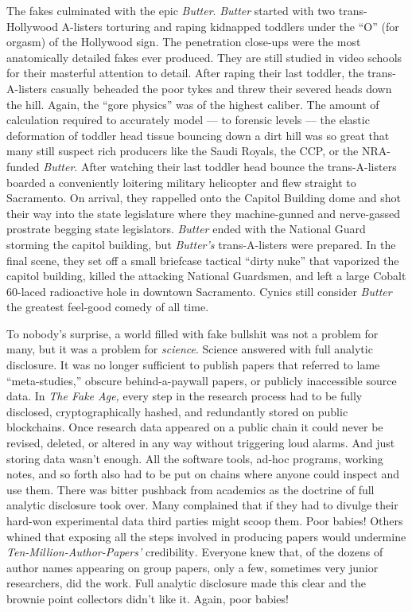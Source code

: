 The fakes culminated with the epic \emph{Butter}. \emph{Butter} started
with two trans-Hollywood A-listers torturing and raping kidnapped
toddlers under the ``O'' (for orgasm) of the Hollywood sign. The
penetration close-ups were the most anatomically detailed fakes ever
produced. They are still studied in video schools for their masterful
attention to detail. After raping their last toddler, the
trans-A-listers casually beheaded the poor tykes and threw their severed
heads down the hill. Again, the ``gore physics'' was of the highest
caliber. The amount of calculation required to accurately model --- to
forensic levels --- the elastic deformation of toddler head tissue
bouncing down a dirt hill was so great that many still suspect rich
producers like the Saudi Royals, the CCP, or the NRA-funded
\emph{Butter}. After watching their last toddler head bounce the
trans-A-listers boarded a conveniently loitering military helicopter and
flew straight to Sacramento. On arrival, they rappelled onto the Capitol
Building dome and shot their way into the state legislature where they
machine-gunned and nerve-gassed prostrate begging state legislators.
\emph{Butter} ended with the National Guard storming the capitol
building, but \emph{Butter's} trans-A-listers were prepared. In the
final scene, they set off a small briefcase tactical ``dirty nuke'' that
vaporized the capitol building, killed the attacking National Guardsmen,
and left a large Cobalt 60-laced radioactive hole in downtown
Sacramento. Cynics still consider \emph{Butter} the greatest feel-good
comedy of all time.

To nobody's surprise, a world filled with fake bullshit was not a
problem for many, but it was a problem for \emph{science}. Science
answered with full analytic disclosure. It was no longer sufficient to
publish papers that referred to lame ``meta-studies,'' obscure
behind-a-paywall papers, or publicly inaccessible source data. In
\emph{The Fake Age,} every step in the research process had to be fully
disclosed, cryptographically hashed, and redundantly stored on public
blockchains. Once research data appeared on a public chain it could
never be revised, deleted, or altered in any way without triggering loud
alarms. And just storing data wasn't enough. All the software tools,
ad-hoc programs, working notes, and so forth also had to be put on
chains where anyone could inspect and use them. There was bitter
pushback from academics as the doctrine of full analytic disclosure took
over. Many complained that if they had to divulge their hard-won
experimental data third parties might scoop them. Poor babies! Others
whined that exposing all the steps involved in producing papers would
undermine \emph{Ten-Million-Author-Papers'} credibility\emph{.} Everyone
knew that, of the dozens of author names appearing on group papers, only
a few, sometimes very junior researchers, did the work. Full analytic
disclosure made this clear and the brownie point collectors didn't like
it. Again, poor babies!

